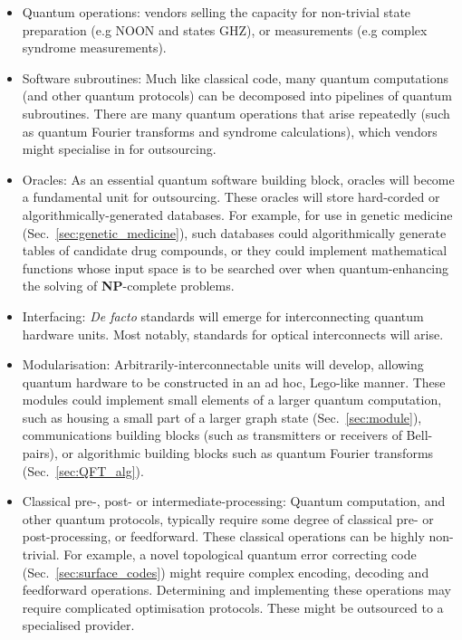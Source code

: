 \begin{itemize}
\item Quantum operations: vendors selling the capacity for non-trivial state preparation (e.g NOON and states GHZ), or measurements (e.g complex syndrome measurements).

\item Software subroutines: Much like classical code, many quantum computations (and other quantum protocols) can be decomposed into pipelines of quantum subroutines. There are many quantum operations that arise repeatedly (such as quantum Fourier transforms and syndrome calculations), which vendors might specialise in for outsourcing.

\item Oracles: As an essential quantum software building block, oracles will become a fundamental unit for outsourcing. These oracles will store hard-corded or algorithmically-generated databases. For example, for use in genetic medicine (Sec.~\ref{sec:genetic_medicine}), such databases could algorithmically generate tables of candidate drug compounds, or they could implement mathematical functions whose input space is to be searched over when quantum-enhancing the solving of \textbf{NP}-complete problems.

\item Interfacing: \textit{De facto} standards will emerge for interconnecting quantum hardware units. Most notably, standards for optical interconnects will arise.

\item Modularisation: Arbitrarily-interconnectable units will develop, allowing quantum hardware to be constructed in an ad hoc, Lego-like manner. These modules could implement small elements of a larger quantum computation, such as housing a small part of a larger graph state (Sec.~\ref{sec:module}), communications building blocks (such as transmitters or receivers of Bell-pairs), or algorithmic building blocks such as quantum Fourier transforms (Sec.~\ref{sec:QFT_alg}).

\item Classical pre-, post- or intermediate-processing: Quantum computation, and other quantum protocols, typically require some degree of classical pre- or post-processing, or feedforward. These classical operations can be highly non-trivial. For example, a novel topological quantum error correcting code (Sec.~\ref{sec:surface_codes}) might require complex encoding, decoding and feedforward operations. Determining and implementing these operations may require complicated optimisation protocols. These might be outsourced to a specialised provider.


\end{itemize}
